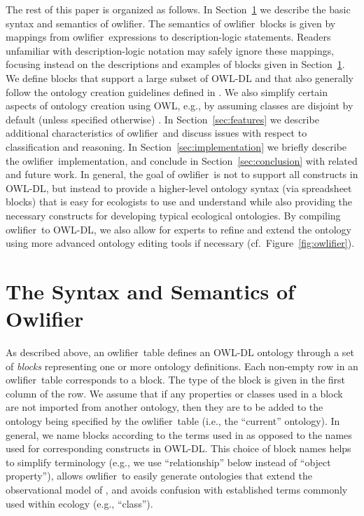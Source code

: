 \documentclass[5p,authoryear]{elsarticle}
\newcommand{\Owlifier}{\textsf{Owlifier}}
\newcommand{\owlifier}{\textsf{owlifier}}
\newcommand{\secref}[1]{Section~\ref{#1}}
\newcommand{\figref}[1]{Figure~\ref{#1}}
\begin{document}
The rest of this paper is organized as follows. In \secref{sec:owlifier} we describe the basic syntax and semantics of \owlifier. The semantics of \owlifier\ blocks is given by mappings from \owlifier\ expressions to description-logic statements. Readers unfamiliar with description-logic notation may safely ignore these mappings, focusing instead on the descriptions and examples of blocks given in \secref{sec:owlifier}.  We define blocks that support a large subset of OWL-DL and that also generally follow the ontology creation guidelines defined in \citep{rector04:_owl_pizzas}. We also simplify certain aspects of ontology creation using OWL, e.g., by assuming classes are disjoint by default (unless specified otherwise) \citep{rector04:_owl_pizzas}. In \secref{sec:features} we describe additional characteristics of \owlifier\ and discuss issues with respect to classification and reasoning. In \secref{sec:implementation} we briefly describe the \owlifier\ implementation, and conclude in \secref{sec:conclusion} with related and future work. In general, the goal of \owlifier\ is not to support all constructs in OWL-DL, but instead to provide a higher-level ontology syntax (via spreadsheet blocks) that is easy for ecologists to use and understand while also providing the necessary constructs for developing typical ecological ontologies. By compiling \owlifier\ to OWL-DL, we also allow for experts to refine and extend the ontology using more advanced ontology editing tools if necessary (cf.~\figref{fig:owlifier}).



\section{The Syntax and Semantics of \Owlifier}
\label{sec:owlifier}

As described above, an \owlifier\ table defines an OWL-DL \citep{smith04:_owl_web_ontol_languag_guide} ontology through a set of \emph{blocks} representing one or more ontology definitions.  Each non-empty row in an \owlifier\ table corresponds to a block. The type of the block is given in the first column of the row.
We assume that if any properties or classes used in a block are not imported from another ontology, then they are to be added to the ontology being specified by the \owlifier\ table (i.e., the ``current'' ontology). In general, we name blocks according to the terms used in \citep{bowers08:_concep_model_framew_for_expres,madin07:_ontol_for_descr_and_synth} as opposed to the names used for corresponding constructs in OWL-DL. This choice of block names helps to simplify terminology (e.g., we use ``relationship'' below instead of ``object property''), allows \owlifier\ to easily generate ontologies that extend the observational model of \citep{bowers08:_concep_model_framew_for_expres,madin07:_ontol_for_descr_and_synth}, and avoids confusion with established terms commonly used within ecology (e.g., ``class'').
\end{document}
